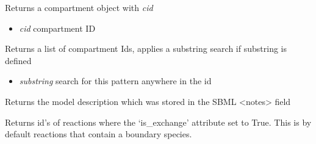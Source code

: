 \documentclass[a4paper,11pt,english]{sphinxmanual}
\begin{document}
\begin{fulllineitems}
\begin{fulllineitems}
\begin{itemize}
\end{itemize}

\end{fulllineitems}


\begin{fulllineitems}
\label{modules_doc:cbmpy.CBModel.Model.getCompartment}
Returns a compartment object with \emph{cid}
\begin{itemize}
\item {} 
\emph{cid} compartment ID

\end{itemize}

\end{fulllineitems}


\begin{fulllineitems}
\label{modules_doc:cbmpy.CBModel.Model.getCompartmentIds}
Returns a list of compartment Ids, applies a substring search if substring is defined
\begin{itemize}
\item {} 
\emph{substring} search for this pattern anywhere in the id

\end{itemize}

\end{fulllineitems}


\begin{fulllineitems}
\label{modules_doc:cbmpy.CBModel.Model.getDescription}
Returns the model description which was stored in the SBML \textless{}notes\textgreater{} field

\end{fulllineitems}


\begin{fulllineitems}
\label{modules_doc:cbmpy.CBModel.Model.getExchangeReactionIds}
Returns id's of reactions where the `is\_exchange' attribute set to True. This is by default
reactions that contain a boundary species.


\end{fulllineitems}
\end{fulllineitems}
\end{document}
